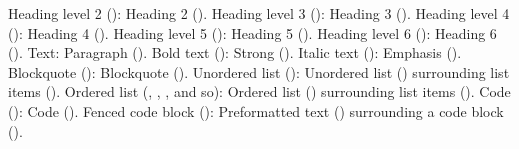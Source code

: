 \markdownRendererUlItem Heading level 2 (\markdownRendererCodeSpan{\markdownRendererHash{}\markdownRendererHash{}}): Heading 2 ().\markdownRendererUlItemEnd 
\markdownRendererUlItem Heading level 3 (\markdownRendererCodeSpan{\markdownRendererHash{}\markdownRendererHash{}\markdownRendererHash{}}): Heading 3 ().\markdownRendererUlItemEnd 
\markdownRendererUlItem Heading level 4 (\markdownRendererCodeSpan{\markdownRendererHash{}\markdownRendererHash{}\markdownRendererHash{}\markdownRendererHash{}}): Heading 4 ().\markdownRendererUlItemEnd 
\markdownRendererUlItem Heading level 5 (\markdownRendererCodeSpan{\markdownRendererHash{}\markdownRendererHash{}\markdownRendererHash{}\markdownRendererHash{}\markdownRendererHash{}}): Heading 5 ().\markdownRendererUlItemEnd 
\markdownRendererUlItem Heading level 6 (\markdownRendererCodeSpan{\markdownRendererHash{}\markdownRendererHash{}\markdownRendererHash{}\markdownRendererHash{}\markdownRendererHash{}\markdownRendererHash{}}): Heading 6 ().\markdownRendererUlItemEnd 
\markdownRendererUlItem Text: Paragraph ().\markdownRendererUlItemEnd 
\markdownRendererUlItem Bold text (): Strong ().\markdownRendererUlItemEnd 
\markdownRendererUlItem Italic text (): Emphasis ().\markdownRendererUlItemEnd 
\markdownRendererUlItem Blockquote (\markdownRendererCodeSpan{>}): Blockquote ().\markdownRendererUlItemEnd 
\markdownRendererUlItem Unordered list (\markdownRendererCodeSpan{-}): Unordered list () surrounding list items ().\markdownRendererUlItemEnd 
\markdownRendererUlItem Ordered list (, , , and so): Ordered list () surrounding list items ().\markdownRendererUlItemEnd 
\markdownRendererUlItem Code (): Code ().\markdownRendererUlItemEnd 
\markdownRendererUlItem Fenced code block (): Preformatted text () surrounding a code block ().\markdownRendererUlItemEnd 
